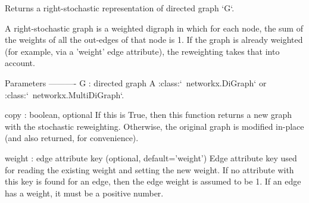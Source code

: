 \begin{DoxyVerb}Returns a right-stochastic representation of directed graph `G`.

A right-stochastic graph is a weighted digraph in which for each
node, the sum of the weights of all the out-edges of that node is
1. If the graph is already weighted (for example, via a 'weight'
edge attribute), the reweighting takes that into account.

Parameters
----------
G : directed graph
    A :class:`~networkx.DiGraph` or :class:`~networkx.MultiDiGraph`.

copy : boolean, optional
    If this is True, then this function returns a new graph with
    the stochastic reweighting. Otherwise, the original graph is
    modified in-place (and also returned, for convenience).

weight : edge attribute key (optional, default='weight')
    Edge attribute key used for reading the existing weight and
    setting the new weight.  If no attribute with this key is found
    for an edge, then the edge weight is assumed to be 1. If an edge
    has a weight, it must be a positive number.\end{DoxyVerb}
 